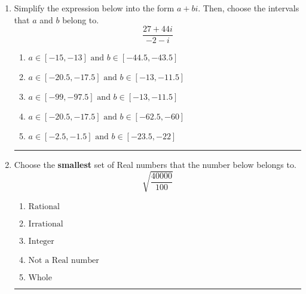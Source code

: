 \documentclass[14pt]{extbook}
\newcommand{\litem}[1]{\item#1\hspace*{-1cm}\rule{\textwidth}{0.4pt}}
\begin{document}
\begin{enumerate}
{\begin{enumerate}[label=\Alph*.]
\end{enumerate} }
\litem{
Simplify the expression below into the form $a+bi$. Then, choose the intervals that $a$ and $b$ belong to.\[ \frac{27 + 44 i}{-2 - i} \]\begin{enumerate}[label=\Alph*.]
\item \( a \in [-15, -13] \text{ and } b \in [-44.5, -43.5] \)
\item \( a \in [-20.5, -17.5] \text{ and } b \in [-13, -11.5] \)
\item \( a \in [-99, -97.5] \text{ and } b \in [-13, -11.5] \)
\item \( a \in [-20.5, -17.5] \text{ and } b \in [-62.5, -60] \)
\item \( a \in [-2.5, -1.5] \text{ and } b \in [-23.5, -22] \)

\end{enumerate} }
\litem{
Choose the \textbf{smallest} set of Real numbers that the number below belongs to.\[ \sqrt{\frac{40000}{100}} \]\begin{enumerate}[label=\Alph*.]
\item \( \text{Rational} \)
\item \( \text{Irrational} \)
\item \( \text{Integer} \)
\item \( \text{Not a Real number} \)
\item \( \text{Whole} \)

\end{enumerate} }
\end{enumerate}
\end{document}
